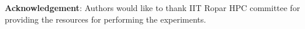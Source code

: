 \documentclass[conference]{IEEEtran}
\begin{document}
%

\vspace{5mm}

\textbf{Acknowledgement}: Authors would like to thank IIT Ropar HPC committee for providing the resources for performing the experiments. 




\end{document}
